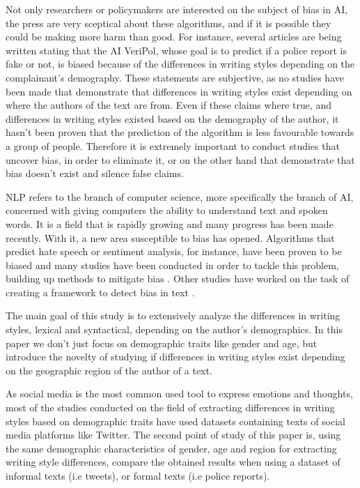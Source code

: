 Not only researchers or policymakers are interested on the subject of bias in AI, the press are very sceptical about these algorithms, and if it is possible they could be making more harm than good. For instance, several articles \cite{jorge2021veripol,pikaramagazine} are being written stating that the AI VeriPol, whose goal is to predict if a police report is fake or not, is biased because of the differences in writing styles depending on the complainant's demography. These statements are subjective, as no studies have been made that demonstrate that differences in writing styles exist depending on where the authors of the text are from. Even if these claims where true, and differences in writing styles existed based on the demography of the author, it hasn't been proven that the prediction of the algorithm is less favourable towards a group of people. Therefore it is extremely important to conduct studies that uncover bias, in order to eliminate it, or on the other hand that demonstrate that bias doesn't exist and silence false claims. 

\acrshort{NLP} refers to the branch of computer science, more specifically the branch of \acrshort{AI}, concerned with giving computers the ability to understand text and spoken words. It is a field that is rapidly growing and many progress has been made recently. With it, a new area susceptible to bias has opened. Algorithms that predict hate speech or sentiment analysis, for instance, have been proven to be biased \cite{thelwall2018gender,kiritchenko2018examining} and many studies have been conducted in order to tackle this problem, building up methods to mitigate bias \cite{dayanik2021disentangling,diaz2018addressing,deshpande2020mitigating}. Other studies have worked on the task of creating a framework to detect bias in text \cite{asyrofi2021biasfinder,feder2020active}. 

The main goal of this study is to extensively analyze the differences in writing styles, lexical and syntactical, depending on the author's demographics. In this paper we don't just focus on demographic traits like gender and age, but introduce the novelty of studying if differences in writing styles exist depending on the geographic region of the author of a text. 

As social media is the most common used tool to express emotions and thoughts, most of the studies conducted on the field of extracting differences in writing styles based on demographic traits have used datasets containing texts of social media platforms like Twitter. The second point of study of this paper is, using the same demographic characteristics of gender, age and region for extracting writing style differences, compare the obtained results when using a dataset of informal texts (i.e tweets), or formal texts (i.e police reports). 

